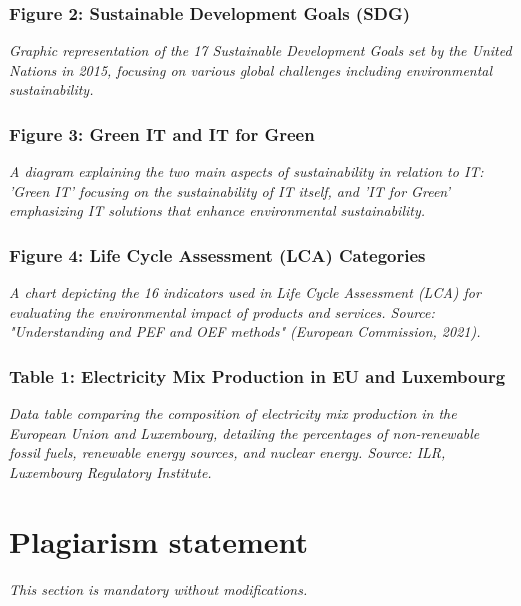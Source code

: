 \documentclass[conference,compsoc]{IEEEtran}
\begin{document}
\subsubsection*{Figure 2: Sustainable Development Goals (SDG)}
\textit{Graphic representation of the 17 Sustainable Development Goals set by the United Nations in 2015, focusing on various global challenges including environmental sustainability.}

\subsubsection*{Figure 3: Green IT and IT for Green}
\textit{A diagram explaining the two main aspects of sustainability in relation to IT: 'Green IT' focusing on the sustainability of IT itself, and 'IT for Green' emphasizing IT solutions that enhance environmental sustainability.}

\subsubsection*{Figure 4: Life Cycle Assessment (LCA) Categories}
\textit{A chart depicting the 16 indicators used in Life Cycle Assessment (LCA) for evaluating the environmental impact of products and services. Source: "Understanding and PEF and OEF methods" (European Commission, 2021).}

\subsubsection*{Table 1: Electricity Mix Production in EU and Luxembourg}
\textit{Data table comparing the composition of electricity mix production in the European Union and Luxembourg, detailing the percentages of non-renewable fossil fuels, renewable energy sources, and nuclear energy. Source: ILR, Luxembourg Regulatory Institute.}


\section*{Plagiarism statement}
\emph{This section is mandatory without modifications.}
\end{document}
